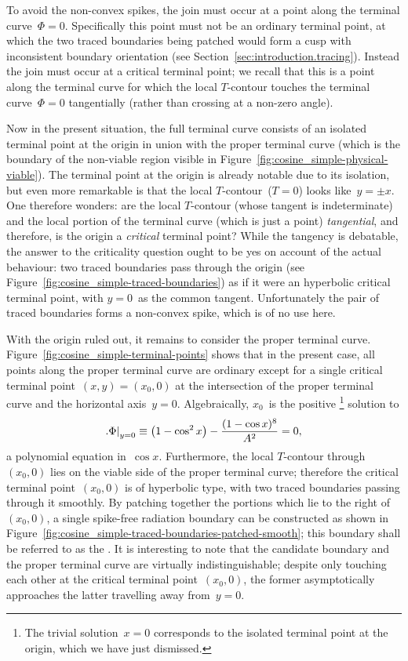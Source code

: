 To avoid the non-convex spikes,
the join must occur at a point along the terminal curve~$\Phi = 0$.
Specifically this point must not be an ordinary terminal point,
at which the two traced boundaries being patched
would form a cusp with inconsistent boundary orientation
(see Section~\ref{sec:introduction.tracing}).
Instead the join must occur at a critical terminal point;
we recall that this is a point along the terminal curve
for which the local $T$-contour touches the terminal curve~$\Phi = 0$
tangentially (rather than crossing at a non-zero angle).

Now in the present situation,
the full terminal curve consists of
an isolated terminal point at the origin
in union with the proper terminal curve
(which is the boundary of the non-viable region
visible in Figure~\ref{fig:cosine_simple-physical-viable}).
The terminal point at the origin is already notable due to its isolation,
but even more remarkable is that the local $T$-contour~($T = 0$)
looks like~$y = \pm x$.
One therefore wonders:
  are the local $T$-contour (whose tangent is indeterminate)
  and the local portion of the terminal curve (which is just a point)
  \emph{tangential}, and therefore,
  is the origin a \emph{critical} terminal point?
While the tangency is debatable,
the answer to the criticality question ought to be yes
on account of the actual behaviour:
two traced boundaries pass through the origin
(see Figure~\ref{fig:cosine_simple-traced-boundaries})
as if it were an hyperbolic critical terminal point,
with $y = 0$~as the common tangent.
Unfortunately the pair of traced boundaries forms a non-convex spike,
which is of no use here.

With the origin ruled out,
it remains to consider the proper terminal curve.
Figure~\ref{fig:cosine_simple-terminal-points} shows that in the present case,
all points along the proper terminal curve are ordinary
except for a single critical terminal point~$(x, y) = (x_0, 0)$
at the intersection of the proper terminal curve
and the horizontal axis~$y = 0$.
Algebraically, $x_0$~is the positive%
\footnote{
  The trivial solution~$x = 0$
  corresponds to the isolated terminal point at the origin,
  which we have just dismissed.
}
solution to
\begin{equation}
  \eval[\textsize]{\Phi}_{y=0}
  \ideq \roundbr*{1 - \cos^2 x} - \frac{(1 - \cos x)^8}{A^2}
  = 0,
  \label{eq:cosine-simple-critical-terminal-point-x}
\end{equation}
a polynomial equation in~$\cos x$.
Furthermore, the local $T$-contour through~$(x_0, 0)$
lies on the viable side of the proper terminal curve;
therefore the critical terminal point~$(x_0, 0)$ is of hyperbolic type,
with two traced boundaries passing through it smoothly.
By patching together the portions which lie to the right of~$(x_0, 0)$,
a single spike-free radiation boundary can be constructed
as shown in Figure~\ref{fig:cosine_simple-traced-boundaries-patched-smooth};
this boundary shall be referred to as the .
It is interesting to note that
the candidate boundary and the proper terminal curve
are virtually indistinguishable;
despite only touching each other at the critical terminal point~$(x_0, 0)$,
the former asymptotically approaches the latter travelling away from~$y = 0$.

